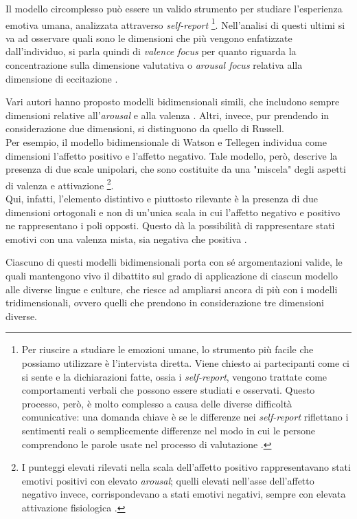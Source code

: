Il modello circomplesso può essere un valido strumento per studiare l'esperienza emotiva umana, analizzata attraverso \textit{self-report} \footnote{Per riuscire a studiare le emozioni umane, lo strumento più facile che possiamo utilizzare è l'intervista diretta. Viene chiesto ai partecipanti come ci si sente e la dichiarazioni fatte, ossia i \textit{self-report}, vengono trattate come comportamenti verbali che possono essere studiati e osservati. Questo processo, però, è molto complesso a causa delle diverse difficoltà comunicative: una domanda chiave è se le differenze nei \textit{self-report} riflettano i sentimenti reali o semplicemente differenze nel modo in cui le persone comprendono le parole usate nel processo di valutazione \parencite{barrett}.}. Nell'analisi di questi ultimi si va ad osservare quali sono le dimensioni che più vengono enfatizzate dall'individuo, si parla quindi di \textit{valence focus} per quanto riguarda la concentrazione sulla dimensione valutativa o \textit{arousal focus} relativa alla dimensione di eccitazione \parencite{barrett}.

Vari autori hanno proposto modelli bidimensionali simili, che includono sempre dimensioni relative all'\textit{arousal} e alla valenza \parencite{Larsen}. Altri, invece, pur prendendo in considerazione due dimensioni, si distinguono da quello di Russell.\\
Per esempio, il modello bidimensionale di Watson e Tellegen individua come dimensioni l'affetto positivo e l'affetto negativo. Tale modello, però, descrive la presenza di due scale unipolari, che sono costituite da una "miscela" degli aspetti di valenza e attivazione \footnote{I punteggi elevati rilevati nella scala dell'affetto positivo rappresentavano stati emotivi positivi con elevato \textit{arousal}; quelli elevati nell'asse dell'affetto negativo invece, corrispondevano a stati emotivi negativi, sempre con elevata attivazione fisiologica \parencite{Watson}.}.\\
Qui, infatti, l'elemento distintivo e piuttosto rilevante è la presenza di due dimensioni ortogonali e non di un'unica scala in cui l'affetto negativo e positivo ne rappresentano i poli opposti. Questo dà la possibilità di rappresentare stati emotivi con una valenza mista, sia negativa che positiva \parencite{Watson}.

Ciascuno di questi modelli bidimensionali porta con sé argomentazioni valide, le quali mantengono vivo il dibattito sul grado di applicazione di ciascun modello alle diverse lingue e culture, che riesce ad ampliarsi ancora di più con i modelli tridimensionali, ovvero quelli che prendono in considerazione tre dimensioni diverse.

